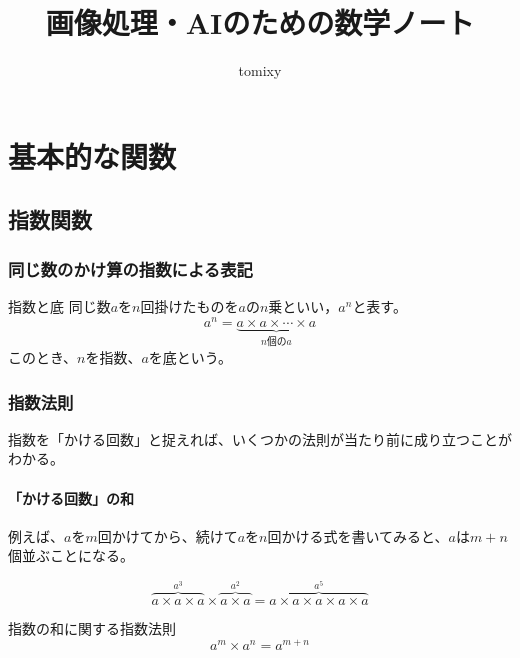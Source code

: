 \documentclass[16pt,b5paper]{book}
\title{画像処理・AIのための数学ノート}
\author{tomixy}
\begin{document}
\maketitle
\tableofcontents

\chapter{基本的な関数}

\section{指数関数}

\subsection{同じ数のかけ算の指数による表記}

\begin{definition}{指数と底}
  \newline
  同じ数$a$を$n$回掛けたものを$a$の$n$乗といい，$a^n$と表す。
  \LARGE
  \begin{equation}
    a^n = \underbrace{a \times a \times \cdots \times a}_{n\text{個の}a}
  \end{equation}
  \normalsize
  このとき、$n$を指数、$a$を底という。
\end{definition}

\subsection{指数法則}

指数を「かける回数」と捉えれば、いくつかの法則が当たり前に成り立つことがわかる。

\subsubsection{「かける回数」の和}

例えば、$a$を$m$回かけてから、続けて$a$を$n$回かける式を書いてみると、$a$は$m+n$個並ぶことになる。

\begin{equation}
  \overbrace{a\times a\times a}^{a^3} \times \overbrace{a\times a}^{a^2} = \overbrace{a\times a\times a\times a\times a}^{a^5}
\end{equation}

\begin{theorem}{指数の和に関する指数法則}
  \LARGE
  \begin{equation}
    a^m \times a^n = a^{m+n}
  \end{equation}
\end{theorem}
\end{document}
